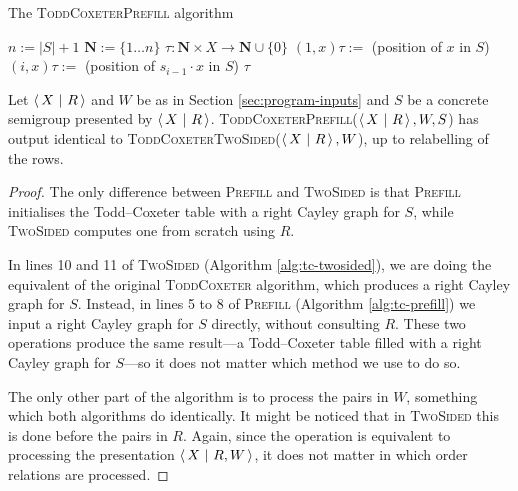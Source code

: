 \begin{algorithm}
\caption{The \textsc{ToddCoxeterPrefill} algorithm}
\label{alg:tc-prefill}
\begin{algorithmic}[1]
\State $n := |S| + 1$
\State $\mathbf{N} := \{1 \ldots n\}$
\State $\tau : \mathbf{N} \times X \to \mathbf{N} \cup \{0\}$
  \State $(1, x)\tau :=$ (position of $x$ in $S$)
    \State $(i, x)\tau :=$ (position of $s_{i-1} \cdot x$ in $S$)
  \EndFor
\EndFor
{}
    \State {}
  \EndFor
\EndFor
\State \Return $\tau$
\EndProcedure
\end{algorithmic}
\end{algorithm}

\begin{theorem}
  Let $\left\langle\,X ~\middle|~ R\,\right\rangle$ and $W$ be as in Section \ref{sec:program-inputs} and $S$ be a
  concrete semigroup presented by $\left\langle\,X ~\middle|~ R\,\right\rangle$.
  \textsc{ToddCoxeterPrefill}($\left\langle\,X ~\middle|~ R\,\right\rangle, W, S$) has output identical to
  \textsc{ToddCoxeterTwoSided}($\left\langle\,X ~\middle|~ R\,\right\rangle, W$), up to relabelling of the rows.
  \begin{proof}
    The only difference between \textsc{Prefill} and \textsc{TwoSided} is that
    \textsc{Prefill} initialises the Todd--Coxeter table with a right Cayley
    graph for $S$, while \textsc{TwoSided} computes one from scratch using $R$.


    In lines 10 and 11 of \textsc{TwoSided} (Algorithm \ref{alg:tc-twosided}),
    we are doing the equivalent of the original \textsc{ToddCoxeter} algorithm,
    which produces a right Cayley graph for $S$.  Instead, in lines 5 to 8 of
    \textsc{Prefill} (Algorithm \ref{alg:tc-prefill}) we input a right Cayley
    graph for $S$ directly, without consulting $R$.  These two operations
    produce the same result---a Todd--Coxeter table filled with a right Cayley
    graph for $S$---so it does not matter which method we use to do so.

    The only other part of the algorithm is to process the pairs in $W$,
    something which both algorithms do identically.  It might be noticed that in
    \textsc{TwoSided} this is done before the pairs in $R$.  Again, since the
    operation is equivalent to processing the presentation $\left\langle\,X ~\middle|~ R,W\,\right\rangle$, it
    does not matter in which order relations are processed.
  \end{proof}
\end{theorem}

